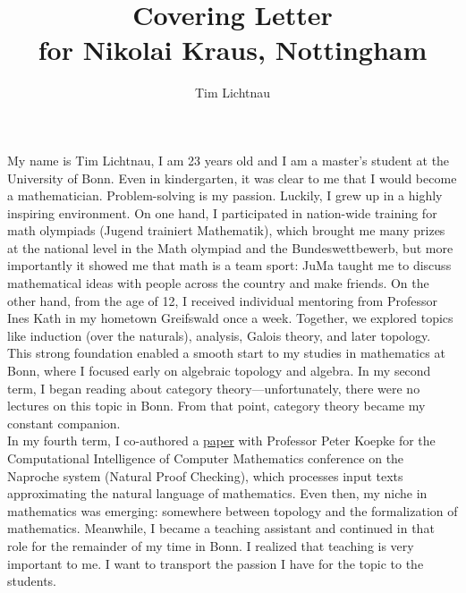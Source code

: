 \documentclass[12pt,headings=small,paper=A4,DIV=calc]{article}
\title{Covering Letter \\  for Nikolai Kraus, Nottingham}
\author{Tim Lichtnau}
\begin{document}
\maketitle
My name is Tim Lichtnau, I am 23 years old and I am a master's student at the University of Bonn. Even in kindergarten, it was clear to me that I would become a mathematician. Problem-solving is my passion. Luckily, I grew up in a highly inspiring environment. On one hand, I participated in nation-wide training for math olympiads (Jugend trainiert Mathematik), which brought me many prizes at the national level in the Math olympiad and the Bundeswettbewerb, but more importantly it showed me that math is a team sport: JuMa taught me to discuss mathematical ideas with people across the country and make friends. On the other hand, from the age of 12, I received individual mentoring from Professor Ines Kath in my hometown Greifswald once a week. Together, we explored topics like induction (over the naturals), analysis, Galois theory, and later topology. \\

This strong foundation enabled a smooth start to my studies in mathematics at Bonn, where I focused early on algebraic topology and algebra. In my second term, I began reading about category theory---unfortunately, there were no lectures on this topic in Bonn. From that point, category theory became my constant companion. \\
In my fourth term, I co-authored a \href{https://ceur-ws.org/Vol-3377/natfom2.pdf}{paper} with Professor Peter Koepke for the Computational Intelligence of Computer Mathematics conference on the Naproche system (Natural Proof Checking), which processes input texts approximating the natural language of mathematics. Even then, my niche in mathematics was emerging: somewhere between topology and the formalization of mathematics. Meanwhile, I became a teaching assistant and continued in that role for the remainder of my time in Bonn. I realized that teaching is very important to me. I want to transport the passion I have for the topic to the students.  \\
\end{document}

